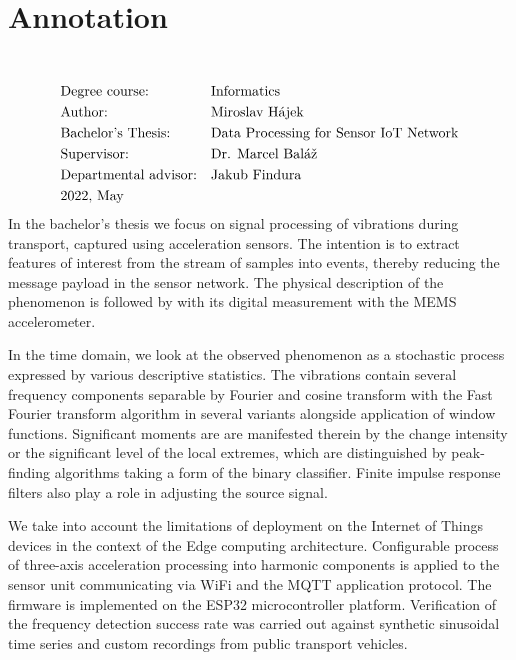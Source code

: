 \section*{Annotation}
\UniversityEN \\
\uppercase{\FacultyEN}
\vspace{-8pt}
{\setlength{\mathindent}{0cm}
\begin{align*}
&\text{Degree course:} && \text{\StudyProgrammeEN} \\
&\text{Author:} && \text{\Author} \\
&\text{\ThesisEN:} && \text{\TitleEN} \\
&\text{Supervisor:} && \text{\SupervisorEN} \\
&\text{Departmental advisor:} && \text{\PedagogicalSupervisorEN} \\
&\text{\DateEN}
\end{align*}}
In the bachelor's thesis we focus on signal processing of vibrations during transport, captured using
acceleration sensors. The intention is to extract features of interest from the stream of samples into events, 
thereby reducing the message payload in the sensor network. The physical description of the 
phenomenon is followed by with its digital measurement with the MEMS accelerometer.

In the time domain, we look at the observed phenomenon as a stochastic process expressed by various descriptive statistics. 
The vibrations contain several frequency components separable by Fourier and cosine transform with the Fast Fourier transform 
algorithm in several variants alongside application of window functions. Significant moments are
are manifested therein by the change intensity or the significant level of the local extremes, which are distinguished by 
peak-finding algorithms taking a form of the binary classifier. Finite impulse response filters also play a role in adjusting
the source signal. 

We take into account the limitations of deployment on the Internet of Things devices in the context of the
Edge computing architecture. Configurable process of three-axis acceleration processing into harmonic components 
is applied to the sensor unit communicating via WiFi and the MQTT application protocol. The firmware is implemented on 
the ESP32 microcontroller platform. Verification of the frequency detection success rate was carried out against synthetic 
sinusoidal time series and custom recordings from public transport vehicles.
\emptypage 
